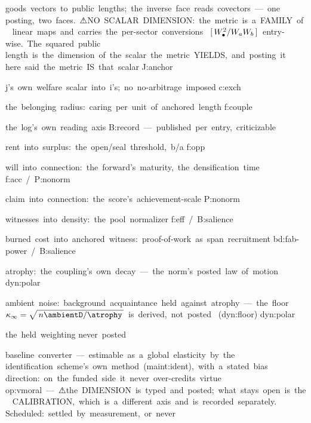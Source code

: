




  { goods~vectors~to~public~lengths;~the~inverse~face~reads~covectors~---~one~
    posting,~two~faces.~⚠NO~SCALAR~DIMENSION:~the~metric~is~a~FAMILY~of~
    linear~maps~and~carries~the~per-sector~conversions~
    $[\,W\sb{\bullet}\sp{2}/W\sb{a}W\sb{b}\,]$~entry-wise.~The~squared~public~
    length~is~the~dimension~of~the~scalar~the~metric~YIELDS,~and~posting~it~
    here~said~the~metric~IS~that~scalar }
  { J:anchor }

  { j's~own~welfare~scalar~into~i's;~no~no-arbitrage~imposed }
  { c:exch }

  { the~belonging~radius:~caring~per~unit~of~anchored~length }
  { f:couple }

  { the~log's~own~reading~axis }
  { B:record~---~published~per~entry,~criticizable }

  { rent~into~surplus:~the~open/seal~threshold,~b/a }
  { f:opp }

  { will~into~connection:~the~forward's~maturity,~the~densification~time }
  { f:acc~/~P:nonorm }

  { claim~into~connection:~the~score's~achievement-scale }
  { P:nonorm }

  { witnesses~into~density:~the~pool~normalizer }
  { f:eff~/~B:salience }

  { burned~cost~into~anchored~witness:~proof-of-work~as~span~recruitment }
  { bd:fab-power~/~B:salience }

  { atrophy:~the~coupling's~own~decay~---~the~norm's~posted~law~of~motion }
  { dyn:polar }

  { ambient~noise:~background~acquaintance~held~against~atrophy~---~the~floor~
    $\ambientcoupling=\sqrt{\,n\ambientD/\atrophy\,}$~is~derived,~not~posted~
    (dyn:floor) }
  { dyn:polar }

  { the~held~weighting }
  { never~posted }

  { baseline~converter~---~estimable~as~a~global~elasticity~by~the~
    identification~scheme's~own~method~(maint:ident),~with~a~stated~bias~
    direction:~on~the~funded~side~it~never~over-credits~virtue }
  { op:vmoral~---~⚠the~DIMENSION~is~typed~and~posted;~what~stays~open~is~the~
    CALIBRATION,~which~is~a~different~axis~and~is~recorded~separately.~
    Scheduled:~settled~by~measurement,~or~never }


